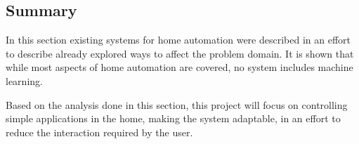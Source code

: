 \subsection{Summary}
In this section existing systems for home automation were described in an effort to describe already explored ways to affect the problem domain. It is shown that while most aspects of home automation are covered, no system includes machine learning.

Based on the analysis done in this section, this project will focus on controlling simple applications in the home, making the system adaptable, in an effort to reduce the interaction required by the user.
